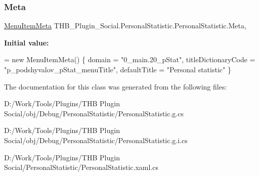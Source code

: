 \subsubsection{\texorpdfstring{Meta}{Meta}}
{\footnotesize\ttfamily \mbox{\hyperlink{class_uniform_client_1_1_plugins_1_1_menu_item_meta}{Menu\+Item\+Meta}} T\+H\+B\+\_\+\+Plugin\+\_\+\+Social.\+Personal\+Statistic.\+Personal\+Statistic.\+Meta\hspace{0.3cm}{\ttfamily [get]}, {\ttfamily [set]}}

{\bfseries Initial value\+:}
\begin{DoxyCode}
= \textcolor{keyword}{new} MenuItemMeta()
        \{
            domain = \textcolor{stringliteral}{"0\_main.20\_pStat"},
            titleDictionaryCode = \textcolor{stringliteral}{"p\_podshyvalov\_pStat\_menuTitle"},
            defaultTitle = \textcolor{stringliteral}{"Personal statistic"}
        \}
\end{DoxyCode}


The documentation for this class was generated from the following files\+:\begin{DoxyCompactItemize}
\item 
D\+:/\+Work/\+Tools/\+Plugins/\+T\+H\+B Plugin Social/obj/\+Debug/\+Personal\+Statistic/Personal\+Statistic.\+g.\+cs\item 
D\+:/\+Work/\+Tools/\+Plugins/\+T\+H\+B Plugin Social/obj/\+Debug/\+Personal\+Statistic/Personal\+Statistic.\+g.\+i.\+cs\item 
D\+:/\+Work/\+Tools/\+Plugins/\+T\+H\+B Plugin Social/\+Personal\+Statistic/Personal\+Statistic.\+xaml.\+cs\end{DoxyCompactItemize}
